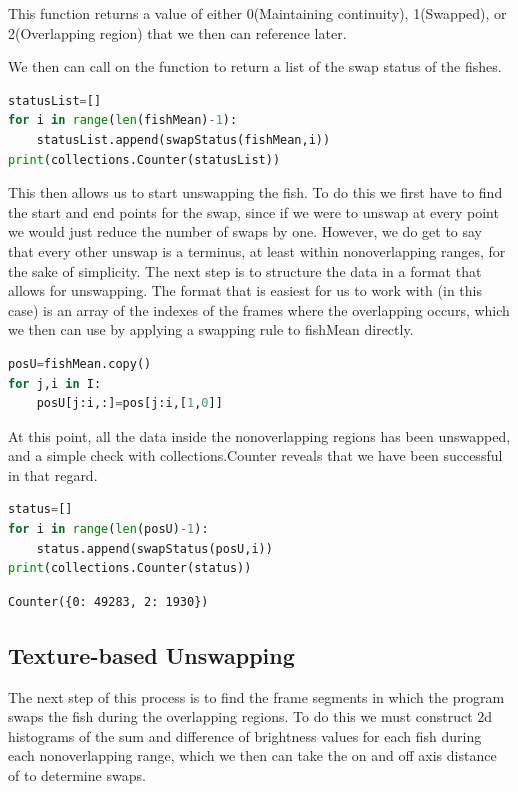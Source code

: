 \documentclass[12pt]{article}
\begin{document}
This function returns a value of  either 0(Maintaining continuity), 1(Swapped), or 2(Overlapping region) that we then can reference later.

We then can call on the function to return a list of the swap status of the fishes.

\begin{minipage}[c]{\textwidth}
\begin{lstlisting}[language=Python]
statusList=[]
for i in range(len(fishMean)-1):
    statusList.append(swapStatus(fishMean,i))
print(collections.Counter(statusList))
\end{lstlisting}
\end{minipage}

This then allows us to start unswapping the fish. To do this we first have to find the start and end points for the swap, since if we were to unswap at every point we would just reduce the number of swaps by one. However, we do get to say that every other unswap is a terminus, at least within nonoverlapping ranges, for the sake of simplicity. The next step is to structure the data in a format that allows for unswapping. The format that is easiest for us to work with (in this case) is an array of the indexes of the frames where the overlapping occurs, which we then can use by applying a swapping rule to fishMean directly.

\begin{minipage}[c]{\textwidth}
\begin{lstlisting}[language=Python]
posU=fishMean.copy()
for j,i in I:
    posU[j:i,:]=pos[j:i,[1,0]]
\end{lstlisting}
\end{minipage}

At this point, all the data inside the nonoverlapping regions has been unswapped, and a simple check with collections.Counter reveals that we have been successful in that regard.

\begin{minipage}[c]{\textwidth}
\begin{lstlisting}[language=Python]
status=[]
for i in range(len(posU)-1):
    status.append(swapStatus(posU,i))
print(collections.Counter(status))
\end{lstlisting}
\end{minipage}
\begin{verbatim}
Counter({0: 49283, 2: 1930})
\end{verbatim}

\subsection{Texture-based Unswapping}
The next step of this process is to find the frame segments in which the program swaps the fish during the overlapping regions. To do this we must construct 2d histograms of the sum and difference of brightness values for each fish during each nonoverlapping range, which we then can take the on and off axis distance of to determine swaps.
\end{document}
